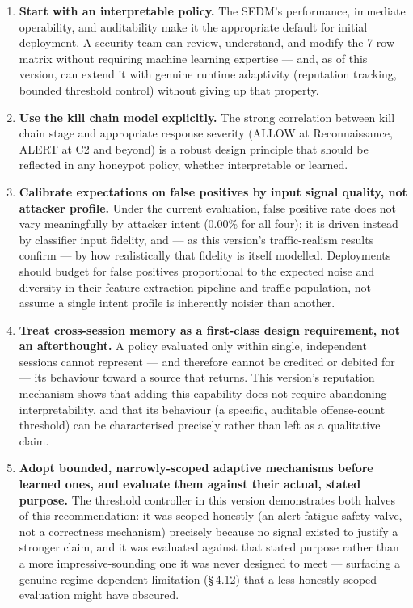 \begin{enumerate}
  \item \textbf{Start with an interpretable policy.}
        The SEDM's performance, immediate operability, and auditability make
        it the appropriate default for initial deployment.
        A security team can review, understand, and modify the 7-row matrix
        without requiring machine learning expertise --- and, as of this
        version, can extend it with genuine runtime adaptivity (reputation
        tracking, bounded threshold control) without giving up that property.

  \item \textbf{Use the kill chain model explicitly.}
        The strong correlation between kill chain stage and appropriate
        response severity (ALLOW at Reconnaissance, ALERT at C2 and beyond)
        is a robust design principle that should be reflected in any honeypot
        policy, whether interpretable or learned.

  \item \textbf{Calibrate expectations on false positives by input signal
        quality, not attacker profile.}
        Under the current evaluation, false positive rate does not vary
        meaningfully by attacker intent (0.00\% for all four); it is driven
        instead by classifier input fidelity, and --- as this version's
        traffic-realism results confirm --- by how realistically that
        fidelity is itself modelled.
        Deployments should budget for false positives proportional to the
        expected noise and diversity in their feature-extraction pipeline and
        traffic population, not assume a single intent profile is inherently
        noisier than another.

  \item \textbf{Treat cross-session memory as a first-class design
        requirement, not an afterthought.}
        A policy evaluated only within single, independent sessions cannot
        represent --- and therefore cannot be credited or debited for --- its
        behaviour toward a source that returns.
        This version's reputation mechanism shows that adding this capability
        does not require abandoning interpretability, and that its behaviour
        (a specific, auditable offense-count threshold) can be characterised
        precisely rather than left as a qualitative claim.

  \item \textbf{Adopt bounded, narrowly-scoped adaptive mechanisms before
        learned ones, and evaluate them against their actual, stated
        purpose.}
        The threshold controller in this version demonstrates both halves of
        this recommendation: it was scoped honestly (an alert-fatigue safety
        valve, not a correctness mechanism) precisely because no signal
        existed to justify a stronger claim, and it was evaluated against
        that stated purpose rather than a more impressive-sounding one it was
        never designed to meet --- surfacing a genuine regime-dependent
        limitation (\S\,4.12) that a less honestly-scoped evaluation might
        have obscured.


\end{enumerate}
